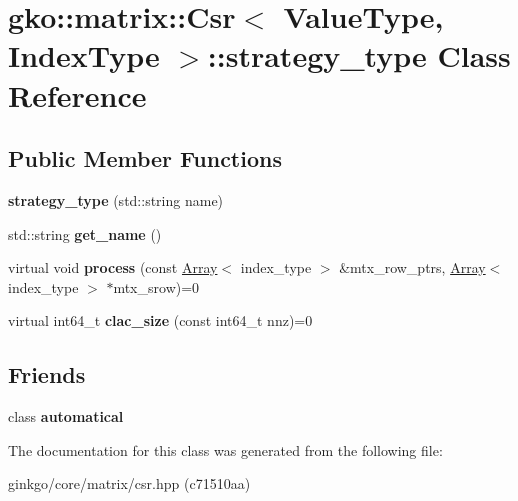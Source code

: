 \hypertarget{classgko_1_1matrix_1_1Csr_1_1strategy__type}{}\section{gko\+:\+:matrix\+:\+:Csr$<$ Value\+Type, Index\+Type $>$\+:\+:strategy\+\_\+type Class Reference}
\label{classgko_1_1matrix_1_1Csr_1_1strategy__type}
\subsection*{Public Member Functions}
\begin{DoxyCompactItemize}
\item 
\mbox{\label{classgko_1_1matrix_1_1Csr_1_1strategy__type_aae6804f7a0b899f03bc0d5e0f139129c}} 
{\bfseries strategy\+\_\+type} (std\+::string name)
\item 
\mbox{\label{classgko_1_1matrix_1_1Csr_1_1strategy__type_a0c22b251b0c1dfd087a5c097488febe0}} 
std\+::string {\bfseries get\+\_\+name} ()
\item 
\mbox{\label{classgko_1_1matrix_1_1Csr_1_1strategy__type_a58bda9208766e57d861262d4059b65b4}} 
virtual void {\bfseries process} (const \hyperlink{classgko_1_1Array}{Array}$<$ index\+\_\+type $>$ \&mtx\+\_\+row\+\_\+ptrs, \hyperlink{classgko_1_1Array}{Array}$<$ index\+\_\+type $>$ $\ast$mtx\+\_\+srow)=0
\item 
\mbox{\label{classgko_1_1matrix_1_1Csr_1_1strategy__type_a07a6dda9dd04ed8abd914f3a69f330f2}} 
virtual int64\+\_\+t {\bfseries clac\+\_\+size} (const int64\+\_\+t nnz)=0
\end{DoxyCompactItemize}
\subsection*{Friends}
\begin{DoxyCompactItemize}
\item 
\mbox{\label{classgko_1_1matrix_1_1Csr_1_1strategy__type_a9e1e07b9f14479534a4043eefd6320cc}} 
class {\bfseries automatical}
\end{DoxyCompactItemize}


The documentation for this class was generated from the following file\+:\begin{DoxyCompactItemize}
\item 
ginkgo/core/matrix/csr.\+hpp (c71510aa)\end{DoxyCompactItemize}
